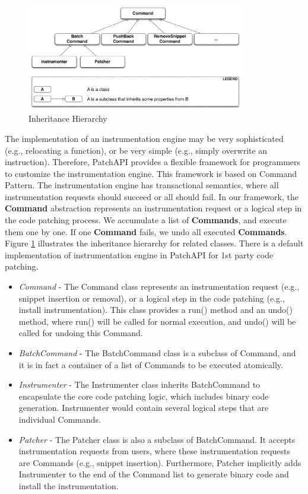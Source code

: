 \documentclass[11pt]{article}
\begin{document}
\begin{figure}[htb]
\centerline{\includegraphics[width=0.85\textwidth]{./figure/command/img.pdf}}
\caption{\label{fig:inh}Inheritance Hierarchy}
\end{figure}


The implementation of an instrumentation engine may be very sophisticated (e.g.,
relocating a function), or be very simple (e.g., simply overwrite an
instruction). Therefore, PatchAPI provides a flexible framework for programmers
to customize the instrumentation engine. This framework is based on Command
Pattern. The instrumentation engine has transactional semantics, where all
instrumentation requests should succeed or all should fail. In our framework,
the \textbf{Command} abstraction represents an instrumentation request or a logical
step in the code patching process. We accumulate a list of \textbf{Commands}, and
execute them one by one. If one \textbf{Command} fails, we undo all executed
\textbf{Commands}. Figure \ref{fig:inh} illustrates the inheritance hierarchy for
related classes. There is a default implementation of instrumentation engine in
PatchAPI for 1st party code patching.
\begin{itemize}
\item \emph{Command} - The Command class represents an instrumentation request (e.g.,
    snippet insertion or removal), or a logical step in the code patching (e.g.,
    install instrumentation). This class provides a run() method and an undo()
    method, where run() will be called for normal execution, and undo() will be
    called for undoing this Command.
\item \emph{BatchCommand} - The BatchCommand class is a subclass of Command, and it is
    in fact a container of a list of Commands to be executed atomically.
\item \emph{Instrumenter} - The Instrumenter class inherits BatchCommand to encapsulate
    the core code patching logic, which includes binary code generation.
    Instrumenter would contain several logical steps that are individual
    Commands.
\item \emph{Patcher} - The Patcher class is also a subclass of BatchCommand. It accepts
    instrumentation requests from users, where these instrumentation requests
    are Commands (e.g., snippet insertion). Furthermore, Patcher implicitly adds
    Instrumenter to the end of the Command list to generate binary code and
    install the instrumentation.
\end{itemize}
\end{document}
